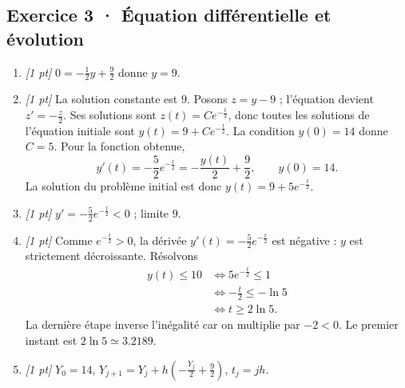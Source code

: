 \subsection*{Exercice 3 · Équation différentielle et évolution}\begin{enumerate}

\item \textit{[1 pt]} $0=-\frac{1}{2}y+\frac{9}{2}$ donne $y=9$.

\item \textit{[1 pt]} La solution constante est $9$. Posons $z=y-9$ ; l'équation devient $z'=-\frac{z}{2}$. Ses solutions sont $z(t)=Ce^{-\frac{t}{2}}$, donc toutes les solutions de l'équation initiale sont $y(t)=9+Ce^{-\frac{t}{2}}$.
La condition $y(0)=14$ donne $C=5$. Pour la fonction obtenue,
\[y'(t)=-\frac{5}{2}e^{-\frac{t}{2}}=-\frac{y(t)}{2}+\frac{9}{2},\qquad y(0)=14.\]
La solution du problème initial est donc $y(t)=9+5e^{-\frac{t}{2}}$.

\item \textit{[1 pt]} $y'=-\frac{5}{2}e^{-\frac{t}{2}}<0$ ; limite $9$.

\item \textit{[1 pt]} Comme $e^{-\frac{t}{2}}>0$, la dérivée $y'(t)=-\frac{5}{2}e^{-\frac{t}{2}}$ est négative : $y$ est strictement décroissante. Résolvons
\[\begin{aligned}y(t)\le 10&\Longleftrightarrow 5e^{-\frac{t}{2}}\le1\\&\Longleftrightarrow -\frac{t}{2}\le-\ln 5\\&\Longleftrightarrow t\ge 2\ln 5.\end{aligned}\]
La dernière étape inverse l'inégalité car on multiplie par $-2<0$. Le premier instant est $2\ln 5\simeq\num{3,2189}$.

\item \textit{[1 pt]} $Y_0=14$, $Y_{j+1}=Y_j+h(-\frac{Y_j}{2}+\frac{9}{2})$, $t_j=jh$.

\end{enumerate}


